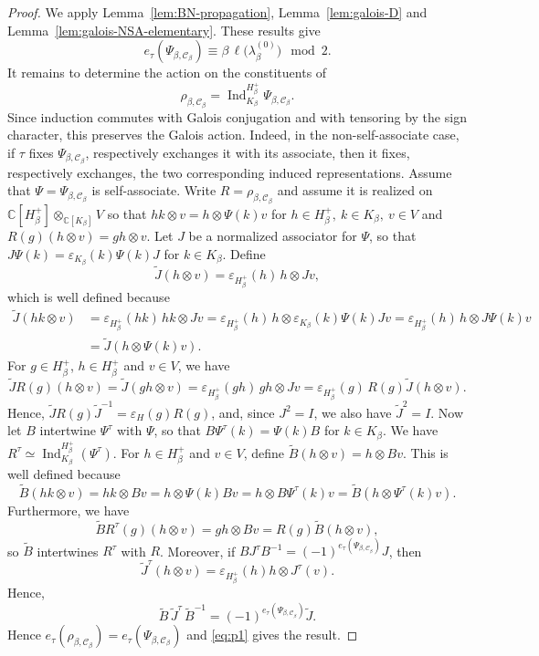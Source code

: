 \documentclass[reqno]{amsart}
\DeclareMathOperator{\Ind}{Ind}
\theoremstyle{definition}
\begin{document}
\begin{proof}
We apply Lemma~\ref{lem:BN-propagation}, Lemma~\ref{lem:galois-D} and
Lemma~\ref{lem:galois-NSA-elementary}. These results give
\begin{equation}
\label{eq:p1}
e_\tau(\Psi_{\beta,\mathcal C_\beta})
\equiv
\beta\,\ell\bigl(\lambda_\beta^{(0)}\bigr)
\mod2.
\end{equation}
It remains to determine the action on the constituents of
\[
\rho_{\beta,\mathcal C_\beta}
=
\Ind_{K_\beta}^{H_\beta^+}
\Psi_{\beta,\mathcal C_\beta}.
\]
Since induction commutes with Galois conjugation and with tensoring by
the sign character, this preserves the Galois action.
Indeed, in the non-self-associate case, if $\tau$ fixes
$\Psi_{\beta,\mathcal C_\beta}$, respectively exchanges it with its
associate, then it fixes, respectively exchanges, the two corresponding
induced representations. 
Assume that $\Psi=\Psi_{\beta,\mathcal C_\beta}$ is self-associate. Write
$R=\rho_{\beta,\mathcal C_\beta}$ and assume it is realized on
$\mathbb C[H_\beta^+]\otimes_{\mathbb C[K_\beta]}V$
so that $ hk\otimes v=h\otimes\Psi(k)v$ for $h\in H_\beta^+,\ k\in
K_\beta,\ v\in V$ and $ R(g)(h\otimes v)=gh\otimes v$.
Let $J$ be a normalized associator for $\Psi$, so that
$
J\Psi(k)=\varepsilon_{K_\beta}(k)\Psi(k)J$ for $k\in K_\beta$.
Define
\[
\widetilde J(h\otimes v)
=
\varepsilon_{H_\beta^+}(h)\,h\otimes Jv,
\]
which is well defined because
\[
\begin{aligned}
\widetilde J(hk\otimes v)
&=
\varepsilon_{H_\beta^+}(hk)\,hk\otimes Jv
=
\varepsilon_{H_\beta^+}(h)\,
h\otimes\varepsilon_{K_\beta}(k)\Psi(k)Jv
=
\varepsilon_{H_\beta^+}(h)\,
h\otimes J\Psi(k)v\\
&=
\widetilde J(h\otimes\Psi(k)v).
\end{aligned}
\]
For $g\in H_\beta^+$, $h\in H_{\beta}^+$ and $v\in V$, we have
\[
\widetilde J R(g)(h\otimes v)
=
\widetilde J(gh\otimes v)
=
\varepsilon_{H_\beta^+}(gh)\,gh\otimes Jv
=
\varepsilon_{H_\beta^+}(g)\,
R(g)\widetilde J(h\otimes v).
\]
Hence,
$
\widetilde J R(g)\widetilde J^{-1}
=
\varepsilon_H(g)R(g)$,
and, since $J^2=I$, we also have $\widetilde J^2=I$. 
Now let $B$ intertwine $\Psi^\tau$ with $\Psi$, so that
$
B\Psi^\tau(k)=\Psi(k)B$ for $k\in K_\beta$.
We have %
$ R^\tau\simeq\Ind_{K_\beta}^{H_\beta^+}(\Psi^\tau)$.  For $h\in H_\beta^+$ and
$v\in V$, define $\widetilde B(h\otimes v)=h\otimes Bv$.
This is well defined because
\[
\widetilde B(hk\otimes v)
=
hk\otimes Bv
=
h\otimes\Psi(k)Bv
=
h\otimes B\Psi^\tau(k)v
=
\widetilde B(h\otimes\Psi^\tau(k)v).
\]
Furthermore, we have
\[
\widetilde B R^\tau(g)(h\otimes v)
=
gh\otimes Bv
=
R(g)\widetilde B(h\otimes v),
\]
so $\widetilde B$ intertwines $R^\tau$ with $R$.
Moreover, if
$
B J^\tau B^{-1}
=
(-1)^{e_\tau(\Psi_{\beta,\mathcal C_\beta})}J$,
then 
$$\widetilde{J}^\tau(h\otimes v)=
\varepsilon_{H_\beta^+}(h)h\otimes J^{\tau}(v).
$$
Hence,
\[
\widetilde B\,\widetilde J^\tau\,\widetilde B^{-1}
=
(-1)^{e_\tau(\Psi_{\beta,\mathcal C_\beta})}\widetilde J.
\]
Hence
$
e_\tau(\rho_{\beta,\mathcal C_\beta})
=
e_\tau(\Psi_{\beta,\mathcal C_\beta})
$
and \eqref{eq:p1} gives the result.
\end{proof}
\end{document}
